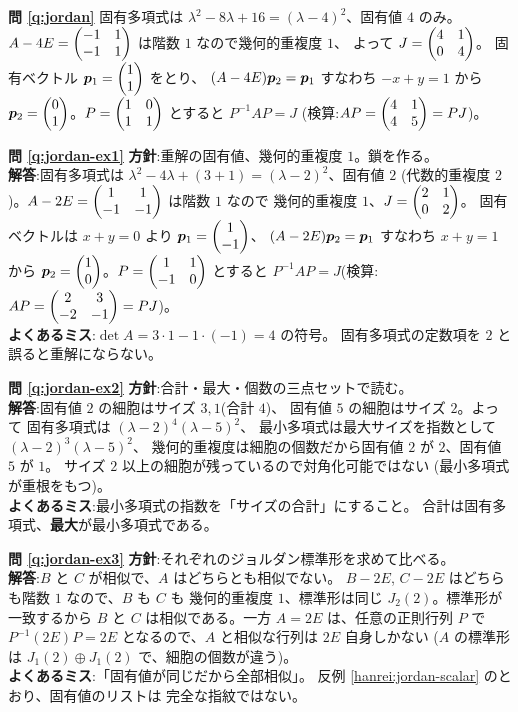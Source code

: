 \bigskip
\noindent\textbf{問 \ref{q:jordan}}\quad
固有多項式は $\lambda^2 - 8\lambda + 16 = (\lambda - 4)^2$、固有値 $4$ のみ。
$A - 4E = \begin{pmatrix}-1 & 1 \\ -1 & 1\end{pmatrix}$ は階数 $1$ なので幾何的重複度 $1$、
よって $J = \begin{pmatrix}4 & 1 \\ 0 & 4\end{pmatrix}$。
固有ベクトル $\bm{p}_1 = \begin{pmatrix}1 \\ 1\end{pmatrix}$ をとり、
$(A - 4E)\bm{p}_2 = \bm{p}_1$ すなわち $-x + y = 1$ から
$\bm{p}_2 = \begin{pmatrix}0 \\ 1\end{pmatrix}$。$P = \begin{pmatrix}1 & 0 \\ 1 & 1\end{pmatrix}$ とすると
$P^{-1}AP = J$
(検算:$AP = \begin{pmatrix}4 & 1 \\ 4 & 5\end{pmatrix} = PJ$)。

\bigskip
\noindent\textbf{問 \ref{q:jordan-ex1}}\quad
\textbf{方針}:重解の固有値、幾何的重複度 $1$。鎖を作る。\\
\textbf{解答}:固有多項式は
$\lambda^2 - 4\lambda + (3 + 1) = (\lambda - 2)^2$、固有値 $2$
(代数的重複度 $2$)。$A - 2E = \begin{pmatrix}1 & 1 \\ -1 & -1\end{pmatrix}$ は階数 $1$ なので
幾何的重複度 $1$、$J = \begin{pmatrix}2 & 1 \\ 0 & 2\end{pmatrix}$。
固有ベクトルは $x + y = 0$ より $\bm{p}_1 = \begin{pmatrix}1 \\ -1\end{pmatrix}$、
$(A - 2E)\bm{p}_2 = \bm{p}_1$ すなわち $x + y = 1$ から
$\bm{p}_2 = \begin{pmatrix}1 \\ 0\end{pmatrix}$。$P = \begin{pmatrix}1 & 1 \\ -1 & 0\end{pmatrix}$ とすると
$P^{-1}AP = J$(検算:$AP = \begin{pmatrix}2 & 3 \\ -2 & -1\end{pmatrix} = PJ$)。\\
\textbf{よくあるミス}:$\det A = 3 \cdot 1 - 1 \cdot (-1) = 4$ の符号。
固有多項式の定数項を $2$ と誤ると重解にならない。

\bigskip
\noindent\textbf{問 \ref{q:jordan-ex2}}\quad
\textbf{方針}:合計・最大・個数の三点セットで読む。\\
\textbf{解答}:固有値 $2$ の細胞はサイズ $3, 1$(合計 $4$)、
固有値 $5$ の細胞はサイズ $2$。よって
固有多項式は $(\lambda - 2)^4(\lambda - 5)^2$、
最小多項式は最大サイズを指数として $(\lambda - 2)^3(\lambda - 5)^2$、
幾何的重複度は細胞の個数だから固有値 $2$ が $2$、固有値 $5$ が $1$。
サイズ $2$ 以上の細胞が残っているので対角化可能ではない
(最小多項式が重根をもつ)。\\
\textbf{よくあるミス}:最小多項式の指数を「サイズの合計」にすること。
合計は固有多項式、\textbf{最大}が最小多項式である。

\bigskip
\noindent\textbf{問 \ref{q:jordan-ex3}}\quad
\textbf{方針}:それぞれのジョルダン標準形を求めて比べる。\\
\textbf{解答}:$B$ と $C$ が相似で、$A$ はどちらとも相似でない。
$B - 2E$, $C - 2E$ はどちらも階数 $1$ なので、$B$ も $C$ も
幾何的重複度 $1$、標準形は同じ $J_2(2)$。標準形が一致するから
$B$ と $C$ は相似である。一方 $A = 2E$ は、任意の正則行列 $P$ で
$P^{-1}(2E)P = 2E$ となるので、$A$ と相似な行列は $2E$ 自身しかない
($A$ の標準形は $J_1(2) \oplus J_1(2)$ で、細胞の個数が違う)。\\
\textbf{よくあるミス}:「固有値が同じだから全部相似」。
反例 \ref{hanrei:jordan-scalar} のとおり、固有値のリストは
完全な指紋ではない。

